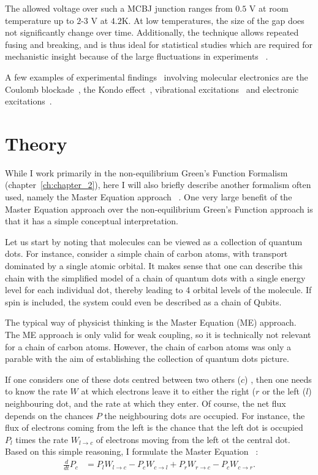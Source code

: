 The allowed voltage over such a MCBJ junction ranges from $0.5$ V at room temperature up to $2$-$3$ V at $4.2$K. At low temperatures, the size of the gap does not significantly change over time. Additionally, the technique allows repeated fusing and breaking, and is thus ideal for statistical studies which are required for mechanistic insight because of the large fluctuations in experiments ~\cite{ratnerrev2013}.

A few examples of experimental findings~\cite{koole} involving molecular electronics are the Coulomb blockade~\cite{Park2000, Park2002}, the Kondo effect~\cite{Park2002}, vibrational excitations~\cite{vib1, vib2} and electronic excitations~\cite{elec1}.

\section{Theory}
\label{sec:theoryintro}
While I work primarily in the non-equilibrium Green's Function Formalism (chapter~\ref{ch:chapter_2}), here I will also briefly describe another formalism often used, namely the Master Equation approach ~\cite{seldenthuis}. One very large benefit of the Master Equation approach over the non-equilibrium Green's Function approach is that it has a simple conceptual interpretation.

Let us start by noting that molecules can be viewed as a collection of quantum dots. For instance, consider a simple chain of carbon atoms, with transport dominated by a single atomic orbital. It makes sense that one can describe this chain with the simplified model of a chain of quantum dots with a single energy level for each individual dot, thereby leading to 4 orbital levels of the molecule. If spin is included, the system could even be described as a chain of Qubits.

The typical way of physicist thinking is the Master Equation (ME) approach. The ME approach is only valid for weak coupling, so it is technically not relevant for a chain of carbon atoms. However, the chain of carbon atoms was only a parable with the aim of establishing the collection of quantum dots picture.

If one considers one of these dots centred between two others ($c$) , then one needs to know the rate $W$ at which electrons leave it to either the right ($r$ or the left ($l$) neighbouring dot, and the rate at which they enter. Of course, the net flux depends on the chances $P$ the neighbouring dots are occupied. For instance, the flux of electrons coming from the left is the chance that the left dot is occupied $P_l$ times the rate $W_{l\rightarrow c}$ of electrons moving from the left ot the central dot. Based on this simple reasoning, I formulate the Master Equation ~\cite{beenakker}:
\begin{align*}
\frac{d}{dt} P_c &= P_l W_{l\rightarrow c} - P_c W_{c\rightarrow l} + P_r  W_{r\rightarrow c} - P_c W_{c\rightarrow r}.
\end{align*}

